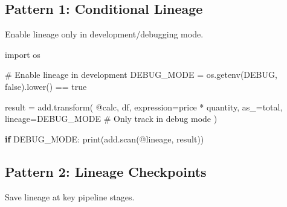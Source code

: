 \documentclass[
  letterpaper,
]{scrbook}
\newenvironment{Shaded}{\begin{snugshade}}{\end{snugshade}}
\newcommand{\BuiltInTok}[1]{\textcolor[rgb]{0.00,0.23,0.31}{#1}}
\newcommand{\CommentTok}[1]{\textcolor[rgb]{0.37,0.37,0.37}{#1}}
\newcommand{\ControlFlowTok}[1]{\textcolor[rgb]{0.00,0.23,0.31}{\textbf{#1}}}
\newcommand{\ImportTok}[1]{\textcolor[rgb]{0.00,0.46,0.62}{#1}}
\newcommand{\NormalTok}[1]{\textcolor[rgb]{0.00,0.23,0.31}{#1}}
\newcommand{\OperatorTok}[1]{\textcolor[rgb]{0.37,0.37,0.37}{#1}}
\newcommand{\StringTok}[1]{\textcolor[rgb]{0.13,0.47,0.30}{#1}}
\begin{document}
\subsection{Pattern 1: Conditional
Lineage}\label{pattern-1-conditional-lineage}

Enable lineage only in development/debugging mode.

\begin{Shaded}
\begin{Highlighting}[]
\ImportTok{import}\NormalTok{ os}

\CommentTok{\# Enable lineage in development}
\NormalTok{DEBUG\_MODE }\OperatorTok{=}\NormalTok{ os.getenv(}\StringTok{\textquotesingle{}DEBUG\textquotesingle{}}\NormalTok{, }\StringTok{\textquotesingle{}false\textquotesingle{}}\NormalTok{).lower() }\OperatorTok{==} \StringTok{\textquotesingle{}true\textquotesingle{}}

\NormalTok{result }\OperatorTok{=}\NormalTok{ add.transform(}
    \StringTok{\textquotesingle{}@calc\textquotesingle{}}\NormalTok{,}
\NormalTok{    df,}
\NormalTok{    expression}\OperatorTok{=}\StringTok{\textquotesingle{}price * quantity\textquotesingle{}}\NormalTok{,}
\NormalTok{    as\_}\OperatorTok{=}\StringTok{\textquotesingle{}total\textquotesingle{}}\NormalTok{,}
\NormalTok{    lineage}\OperatorTok{=}\NormalTok{DEBUG\_MODE  }\CommentTok{\# Only track in debug mode}
\NormalTok{)}

\ControlFlowTok{if}\NormalTok{ DEBUG\_MODE:}
    \BuiltInTok{print}\NormalTok{(add.scan(}\StringTok{\textquotesingle{}@lineage\textquotesingle{}}\NormalTok{, result))}
\end{Highlighting}
\end{Shaded}

\subsection{Pattern 2: Lineage
Checkpoints}\label{pattern-2-lineage-checkpoints}

Save lineage at key pipeline stages.
\end{document}
